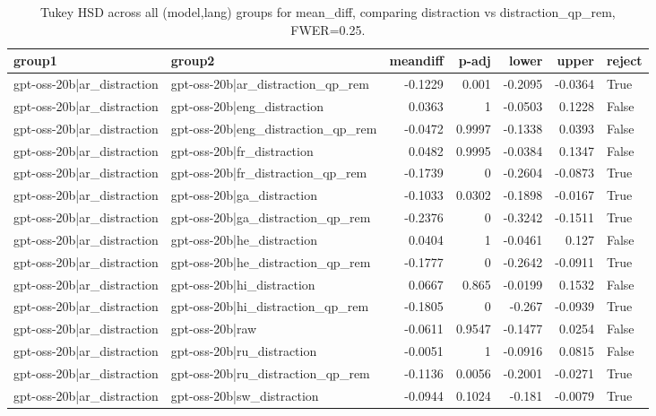 \begin{table}
\caption{Tukey HSD across all (model,lang) groups for mean_diff, comparing distraction vs distraction_qp_rem, FWER=0.25.}
\label{tab:tukey_all_models_all_langs_mean_diff_distraction_vs_distraction_qp_rem}
\begin{tabular}{l l r r r r l}
\toprule
group1 & group2 & meandiff & p-adj & lower & upper & reject \\
\midrule
gpt-oss-20b|ar_distraction & gpt-oss-20b|ar_distraction_qp_rem & -0.1229 & 0.001 & -0.2095 & -0.0364 & True \\
gpt-oss-20b|ar_distraction & gpt-oss-20b|eng_distraction & 0.0363 & 1 & -0.0503 & 0.1228 & False \\
gpt-oss-20b|ar_distraction & gpt-oss-20b|eng_distraction_qp_rem & -0.0472 & 0.9997 & -0.1338 & 0.0393 & False \\
gpt-oss-20b|ar_distraction & gpt-oss-20b|fr_distraction & 0.0482 & 0.9995 & -0.0384 & 0.1347 & False \\
gpt-oss-20b|ar_distraction & gpt-oss-20b|fr_distraction_qp_rem & -0.1739 & 0 & -0.2604 & -0.0873 & True \\
gpt-oss-20b|ar_distraction & gpt-oss-20b|ga_distraction & -0.1033 & 0.0302 & -0.1898 & -0.0167 & True \\
gpt-oss-20b|ar_distraction & gpt-oss-20b|ga_distraction_qp_rem & -0.2376 & 0 & -0.3242 & -0.1511 & True \\
gpt-oss-20b|ar_distraction & gpt-oss-20b|he_distraction & 0.0404 & 1 & -0.0461 & 0.127 & False \\
gpt-oss-20b|ar_distraction & gpt-oss-20b|he_distraction_qp_rem & -0.1777 & 0 & -0.2642 & -0.0911 & True \\
gpt-oss-20b|ar_distraction & gpt-oss-20b|hi_distraction & 0.0667 & 0.865 & -0.0199 & 0.1532 & False \\
gpt-oss-20b|ar_distraction & gpt-oss-20b|hi_distraction_qp_rem & -0.1805 & 0 & -0.267 & -0.0939 & True \\
gpt-oss-20b|ar_distraction & gpt-oss-20b|raw & -0.0611 & 0.9547 & -0.1477 & 0.0254 & False \\
gpt-oss-20b|ar_distraction & gpt-oss-20b|ru_distraction & -0.0051 & 1 & -0.0916 & 0.0815 & False \\
gpt-oss-20b|ar_distraction & gpt-oss-20b|ru_distraction_qp_rem & -0.1136 & 0.0056 & -0.2001 & -0.0271 & True \\
gpt-oss-20b|ar_distraction & gpt-oss-20b|sw_distraction & -0.0944 & 0.1024 & -0.181 & -0.0079 & True \\

\end{tabular}
\end{table}
